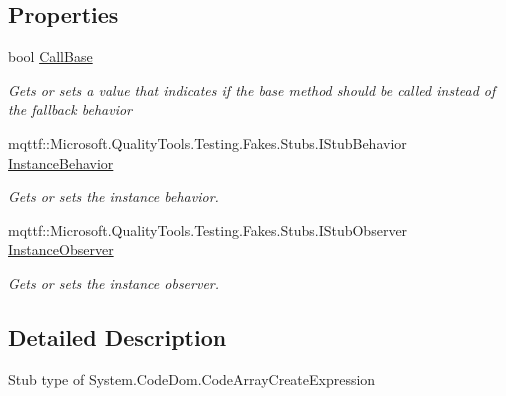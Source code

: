\subsection*{Properties}
\begin{DoxyCompactItemize}
\item 
bool \hyperlink{class_system_1_1_code_dom_1_1_fakes_1_1_stub_code_array_create_expression_a8754b5861a52851131ae3ed77fd0d6ea}{Call\-Base}
\begin{DoxyCompactList}\small\item\em Gets or sets a value that indicates if the base method should be called instead of the fallback behavior\end{DoxyCompactList}\item 
mqttf\-::\-Microsoft.\-Quality\-Tools.\-Testing.\-Fakes.\-Stubs.\-I\-Stub\-Behavior \hyperlink{class_system_1_1_code_dom_1_1_fakes_1_1_stub_code_array_create_expression_a58cb212a8d49a7e915c821387daf543e}{Instance\-Behavior}
\begin{DoxyCompactList}\small\item\em Gets or sets the instance behavior.\end{DoxyCompactList}\item 
mqttf\-::\-Microsoft.\-Quality\-Tools.\-Testing.\-Fakes.\-Stubs.\-I\-Stub\-Observer \hyperlink{class_system_1_1_code_dom_1_1_fakes_1_1_stub_code_array_create_expression_a73e785029766d80c8d5c33bd7e9a2303}{Instance\-Observer}
\begin{DoxyCompactList}\small\item\em Gets or sets the instance observer.\end{DoxyCompactList}\end{DoxyCompactItemize}


\subsection{Detailed Description}
Stub type of System.\-Code\-Dom.\-Code\-Array\-Create\-Expression



